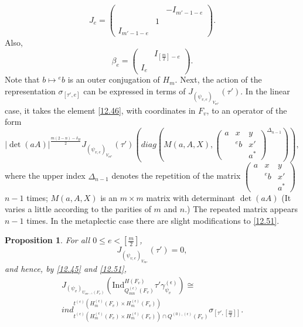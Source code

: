 \documentclass[12pts]{amsart}
\newcommand{\Ind}{{\mathrm{Ind}}}
\newcommand{\I}{{\mathrm{I}}}
\newtheorem{prop}[thm]{Proposition}
\begin{document}
\begin{equation}\label{12.49}
J_e=\begin{pmatrix}&&-I_{m'-1-e}\\&1\\I_{m'-1-e}\end{pmatrix}.
\end{equation}
Also,
\begin{equation}\label{12.50}
\beta_e=\begin{pmatrix}&I_{[\frac{m}{2}]-e}\\I_e\end{pmatrix}.
\end{equation}
Note that $b\mapsto {}^e b$ is an outer conjugation of $H_m$. Next, the action of the representation $\sigma_{[\tau',e]}$ can be expressed in terms of $J_{(\psi_{v,e})_{V_{m^n}}}(\tau')$. In the linear case, it takes the element \eqref{12.46}, with coordinates in $F_v$, to an operator of the form
\begin{equation}\label{12.51}
|\det(aA)|^{\frac{m(2-n)-\delta_H}{2}}J_{(\psi_{v,e})_{V_{m^n}}}(\tau')(diag(M(a,A,X), \begin{pmatrix}a&x&y\\&{}^eb&x'\\&&a^*\end{pmatrix}^{\Delta_{n-1}})),
\end{equation}
where the upper index $\Delta_{n-1}$ denotes the repetition of the matrix $\begin{pmatrix}a&x&y\\&{}^eb&x'\\&&a^*\end{pmatrix}$ $n-1$ times; $M(a,A,X)$ is an $m \times m$ matrix with determinant $\det(aA)$ (It varies a little according to the parities of $m$ and $n$.) The repeated matrix appears $n-1$ times. In the metaplectic case there are slight modifications to \eqref{12.51}.
\begin{prop}\label{prop 12.5}
For all $0\leq e<[\frac{m}{2}]$,
$$
J_{(\psi_{v,e})_{V_{m^n}}}(\tau')=0,
$$
and hence, by \eqref{12.45} and \eqref{12.51},
\begin{multline}\label{12.52}
J_{(\psi_v)_{U_{m^{n-1}}(F_v)}}(\Ind^{H(F_v)}_{Q^{(\epsilon)}_{mn}(F_v)}\tau'\gamma_{\psi_v}^{(\epsilon)})\cong\\ ind^{t^{(\epsilon)}(H^{(\epsilon)}_m(F_v)\times H^{(\epsilon)}_m(F_v))}_{t^{(\epsilon)}(H^{(\epsilon)}_m(F_v)\times H^{(\epsilon)}_m(F_v))\cap Q^{(0),(\epsilon)}(F_v)}\sigma_{[\tau',[\frac{m}{2}]]}.
\end{multline}
\end{prop}
\end{document}
